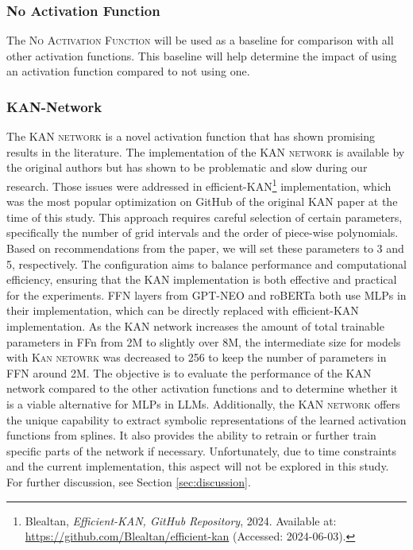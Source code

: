 \subsubsection{No Activation Function}
The \textsc{No Activation Function} will be used as a baseline for comparison with all other activation functions. This baseline will help determine the impact of using an activation function compared to not using one.

\subsubsection{KAN-Network}
The \textsc{KAN network} is a novel activation function that has shown promising results in the literature. The implementation of the \textsc{KAN network} is available by the original authors but has shown to be problematic and slow during our research. Those issues were addressed in efficient-KAN\footnote{\label{footnote:efficient-kan}Blealtan, \textit{Efficient-KAN, GitHub Repository}, 2024. Available at: \url{https://github.com/Blealtan/efficient-kan} (Accessed: 2024-06-03).} implementation, which was the most popular optimization on GitHub of the original KAN paper at the time of this study. This approach requires careful selection of certain parameters, specifically the number of grid intervals and the order of piece-wise polynomials. Based on recommendations from the paper, we will set these parameters to 3 and 5, respectively. The configuration aims to balance performance and computational efficiency, ensuring that the KAN implementation is both effective and practical for the experiments. FFN layers from GPT-NEO and roBERTa both use MLPs in their implementation, which can be directly replaced with efficient-KAN implementation. As the KAN network increases the amount of total trainable parameters in FFn from 2M to slightly over 8M, the intermediate size for models with \textsc{Kan netowrk} was decreased to 256 to keep the number of parameters in FFN around 2M.
The objective is to evaluate the performance of the KAN network compared to the other activation functions and to determine whether it is a viable alternative for MLPs in LLMs. Additionally, the \textsc{KAN network} offers the unique capability to extract symbolic representations of the learned activation functions from splines. It also provides the ability to retrain or further train specific parts of the network if necessary. Unfortunately, due to time constraints and the current implementation, this aspect will not be explored in this study. For further discussion, see Section \ref{sec:discussion}.